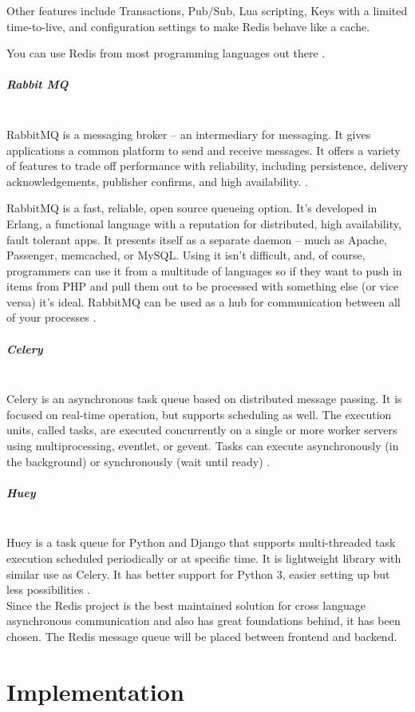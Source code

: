 \documentclass[thesis=B,english]{FITthesis}[2013/04/26]
\newcommand{\myparagraph}[1]{\paragraph{#1}\mbox{}\\}
\begin{document}
Other features include Transactions, Pub/Sub, Lua scripting, Keys with a limited time-to-live, and configuration settings to make Redis behave like a cache.

You can use Redis from most programming languages out there \cite{redis}.

\myparagraph{Rabbit MQ}

RabbitMQ is a messaging broker -- an intermediary for messaging. It gives  applications a common platform to send and receive messages. It offers a variety of features to trade off performance with reliability, including persistence, delivery acknowledgements, publisher confirms, and high availability. \cite{rabbitmq_official}.

RabbitMQ is a fast, reliable, open source queueing option. It's developed in Erlang, a functional language with a reputation for distributed, high availability, fault tolerant apps. It presents itself as a separate daemon -- much as Apache, Passenger, memcached, or MySQL. Using it isn’t difficult, and, of course, programmers can use it from a multitude of languages so if they want to push in items from PHP and pull them out to be processed with something else (or vice versa) it's ideal. RabbitMQ can be used as a hub for communication between all of your processes \cite{rabbitmq}.

\myparagraph{Celery}

Celery is an asynchronous task queue based on distributed message passing. It is focused on real-time operation, but supports scheduling as well. The execution units, called tasks, are executed concurrently on a single or more worker servers using multiprocessing, eventlet, or gevent. Tasks can execute asynchronously (in the background) or synchronously (wait until ready) \cite{celery}.

\myparagraph{Huey}

Huey is a task queue for Python and Django that supports multi-threaded task execution scheduled periodically or at specific time. It is lightweight library with similar use as Celery. It has better support for Python 3, easier setting up but less possibilities \cite{huey}. \\

Since the Redis project is the best maintained solution for cross language asynchronous communication and also has great foundations behind, it has been chosen. The Redis message queue will be placed between frontend and backend.

\chapter{Implementation}
\label{chapter:implementation}
\end{document}
